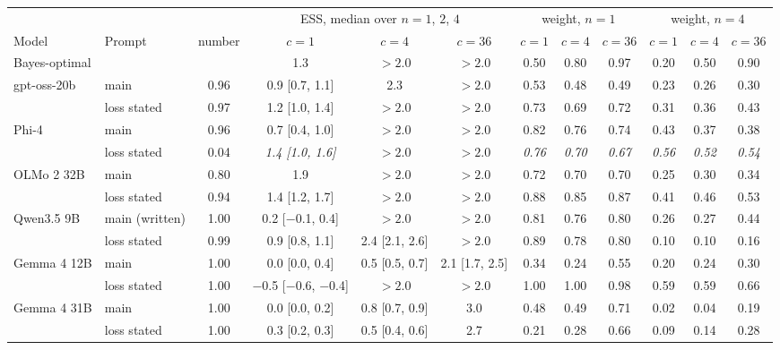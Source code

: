 \begin{tabular}{llcccccccccc}
\toprule
& & & \multicolumn{3}{c}{ESS, median over $n = 1$, $2$, $4$} & \multicolumn{3}{c}{weight, $n = 1$} & \multicolumn{3}{c}{weight, $n = 4$} \\
\cmidrule(lr){4-6} \cmidrule(lr){7-9} \cmidrule(lr){10-12}
Model & Prompt & number & $c = 1$ & $c = 4$ & $c = 36$ & $c = 1$ & $c = 4$ & $c = 36$ & $c = 1$ & $c = 4$ & $c = 36$ \\
\midrule
Bayes-optimal & & & 1.3 & $> 2.0$ & $> 2.0$ & 0.50 & 0.80 & 0.97 & 0.20 & 0.50 & 0.90 \\
\midrule
gpt-oss-20b & main & 0.96 & 0.9 {\scriptsize[0.7, 1.1]} & 2.3 & $> 2.0$ & 0.53 & 0.48 & 0.49 & 0.23 & 0.26 & 0.30 \\
 & loss stated & 0.97 & 1.2 {\scriptsize[1.0, 1.4]} & $> 2.0$ & $> 2.0$ & 0.73 & 0.69 & 0.72 & 0.31 & 0.36 & 0.43 \\
\midrule
Phi-4 & main & 0.96 & 0.7 {\scriptsize[0.4, 1.0]} & $> 2.0$ & $> 2.0$ & 0.82 & 0.76 & 0.74 & 0.43 & 0.37 & 0.38 \\
 & loss stated & 0.04 & \textit{1.4 {\scriptsize[1.0, 1.6]}} & \textit{$> 2.0$} & \textit{$> 2.0$} & \textit{0.76} & \textit{0.70} & \textit{0.67} & \textit{0.56} & \textit{0.52} & \textit{0.54} \\
\midrule
OLMo 2 32B & main & 0.80 & 1.9 & $> 2.0$ & $> 2.0$ & 0.72 & 0.70 & 0.70 & 0.25 & 0.30 & 0.34 \\
 & loss stated & 0.94 & 1.4 {\scriptsize[1.2, 1.7]} & $> 2.0$ & $> 2.0$ & 0.88 & 0.85 & 0.87 & 0.41 & 0.46 & 0.53 \\
\midrule
Qwen3.5 9B & main (written) & 1.00 & 0.2 {\scriptsize[$-$0.1, 0.4]} & $> 2.0$ & $> 2.0$ & 0.81 & 0.76 & 0.80 & 0.26 & 0.27 & 0.44 \\
 & loss stated & 0.99 & 0.9 {\scriptsize[0.8, 1.1]} & 2.4 {\scriptsize[2.1, 2.6]} & $> 2.0$ & 0.89 & 0.78 & 0.80 & 0.10 & 0.10 & 0.16 \\
\midrule
Gemma 4 12B & main & 1.00 & 0.0 {\scriptsize[0.0, 0.4]} & 0.5 {\scriptsize[0.5, 0.7]} & 2.1 {\scriptsize[1.7, 2.5]} & 0.34 & 0.24 & 0.55 & 0.20 & 0.24 & 0.30 \\
 & loss stated & 1.00 & $-$0.5 {\scriptsize[$-$0.6, $-$0.4]} & $> 2.0$ & $> 2.0$ & 1.00 & 1.00 & 0.98 & 0.59 & 0.59 & 0.66 \\
\midrule
Gemma 4 31B & main & 1.00 & 0.0 {\scriptsize[0.0, 0.2]} & 0.8 {\scriptsize[0.7, 0.9]} & 3.0 & 0.48 & 0.49 & 0.71 & 0.02 & 0.04 & 0.19 \\
 & loss stated & 1.00 & 0.3 {\scriptsize[0.2, 0.3]} & 0.5 {\scriptsize[0.4, 0.6]} & 2.7 & 0.21 & 0.28 & 0.66 & 0.09 & 0.14 & 0.28 \\
\bottomrule
\end{tabular}
